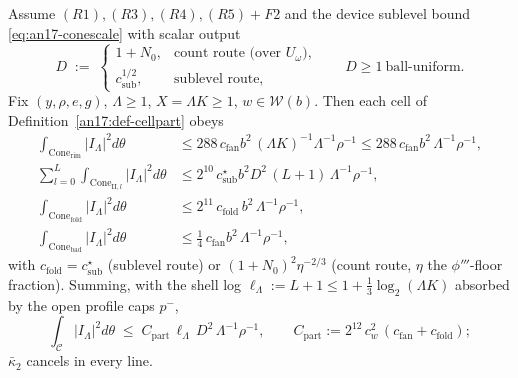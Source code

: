 \begin{lemma}\label{an17:lem-ledger}
Assume $(R1),(R3),(R4),(R5)+F2$ and the device sublevel bound
\eqref{eq:an17-conescale} with scalar output
\begin{equation}\label{eq:an17-Ddef}
 D\;:=\;\begin{cases} 1+N_0, & \text{count route (over $U_\omega$),}\\
 c_{\mathrm{sub}}^{1/2}, & \text{sublevel route,}\end{cases}\qquad D\ge1
 \ \text{ball-uniform}.
\end{equation}
Fix $(y,\rho,e,g)$, $\Lambda\ge1$, $X=\Lambda K\ge1$, $w\in\mathcal W(b)$. Then
each cell of Definition~\ref{an17:def-cellpart} obeys
\begin{align}
 \int_{\mathrm{Cone}_{\mathrm{rim}}}\!\!|I_\Lambda|^2 d\theta
   &\le 288\,c_{\mathrm{fan}}b^2\,(\Lambda K)^{-1}\Lambda^{-1}\rho^{-1}
   \le 288\,c_{\mathrm{fan}}b^2\,\Lambda^{-1}\rho^{-1},\label{eq:an17-rim}\\
 \sum_{l=0}^{L}\int_{\mathrm{Cone}_{\mathrm{II},l}}\!\!|I_\Lambda|^2 d\theta
   &\le 2^{10}\,c_{\mathrm{sub}}^\star b^2 D^2\,(L{+}1)\,\Lambda^{-1}\rho^{-1},
   \label{eq:an17-II}\\
 \int_{\mathrm{Cone}_{\mathrm{fold}}}\!\!|I_\Lambda|^2 d\theta
   &\le 2^{11}\,c_{\mathrm{fold}}\,b^2\,\Lambda^{-1}\rho^{-1},\label{eq:an17-fold}\\
 \int_{\mathrm{Cone}_{\mathrm{bad}}}\!\!|I_\Lambda|^2 d\theta
   &\le \tfrac14\,c_{\mathrm{fan}}b^2\,\Lambda^{-1}\rho^{-1},\label{eq:an17-bad}
\end{align}
with $c_{\mathrm{fold}}=c_{\mathrm{sub}}^\star$ (sublevel route) or
$(1+N_0)^2\eta^{-2/3}$ (count route, $\eta$ the $\phi'''$-floor fraction). Summing,
with the shell log $\ell_\Lambda:=L+1\le1+\tfrac13\log_2(\Lambda K)$ absorbed by the
open profile caps $p^-$,
\begin{equation}\label{eq:an17-Cpart}
 \int_{\mathcal C}|I_\Lambda|^2 d\theta\;\le\;C_{\mathrm{part}}\,\ell_\Lambda\,D^2
 \,\Lambda^{-1}\rho^{-1},\qquad
 C_{\mathrm{part}}:=2^{12}\,c_w^2\,(c_{\mathrm{fan}}+c_{\mathrm{fold}});
\end{equation}
$\bar\kappa_2$ cancels in every line.
\end{lemma}

